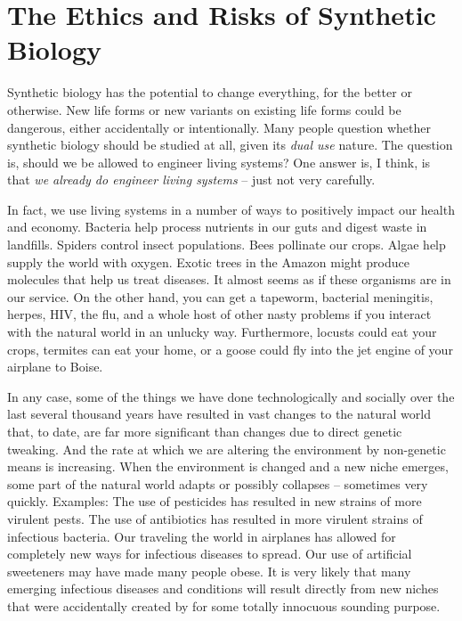 \section{The Ethics and Risks of Synthetic Biology}

Synthetic biology has the potential to change everything, for the
better or otherwise. New life forms or new variants on existing life
forms could be dangerous, either accidentally or intentionally. Many
people question whether synthetic biology should be studied at all,
given its {\em dual use} nature. The question is, should we be allowed
to engineer living systems? One answer is, I think, is that {\em we
  already do engineer living systems} -- just not very carefully. 

In fact, we use living systems in a number of ways to positively
impact our health and economy. Bacteria help process nutrients in our
guts and digest waste in landfills. Spiders control insect
populations. Bees pollinate our crops. Algae help supply the world
with oxygen. Exotic trees in the Amazon might produce molecules that
help us treat diseases. It almost seems as if these organisms are in
our service. On the other hand, you can get a tapeworm, bacterial
meningitis, herpes, HIV, the flu, and a whole host of other nasty
problems if you interact with the natural world in an unlucky
way. Furthermore, locusts could eat your crops, termites can eat your
home, or a goose could fly into the jet engine of your airplane to
Boise.

In any case, some of the things we have done technologically and
socially over the last several thousand years have resulted in vast
changes to the natural world that, to date, are far more significant
than changes due to direct genetic tweaking. And the rate at which we
are altering the environment by non-genetic means is increasing. When
the environment is changed and a new niche emerges, some part of the
natural world adapts or possibly collapses – sometimes very
quickly. Examples: The use of pesticides has resulted in new strains
of more virulent pests. The use of antibiotics has resulted in more
virulent strains of infectious bacteria. Our traveling the world in
airplanes has allowed for completely new ways for infectious diseases
to spread. Our use of artificial sweeteners may have made many people
obese. It is very likely that many emerging infectious diseases and
conditions will result directly from new niches that were accidentally
created by for some totally innocuous sounding purpose.

